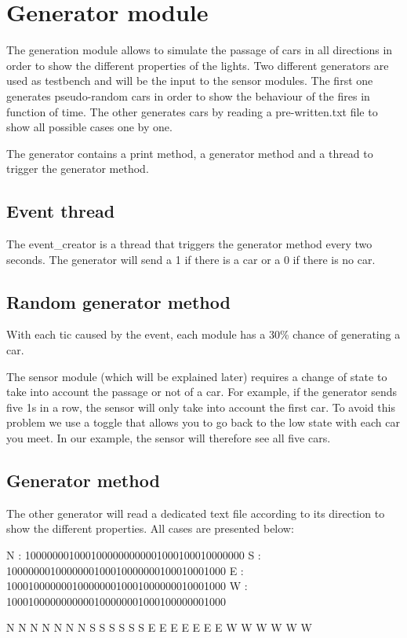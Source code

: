 \section{Generator module}

The generation module allows to simulate the passage of cars in all directions in order to show the different properties of the lights. Two different generators are used as testbench and will be the input to the sensor modules. 
The first one generates pseudo-random cars in order to show the behaviour of the fires in function of time.
The other generates cars by reading a pre-written.txt file to show all possible cases one by one. 

The generator contains a print method, a generator method and a thread to trigger the generator method.

\subsection{Event thread}

The event_creator is a thread that triggers the generator method every two seconds. The generator will send a 1 if there is a car or a 0 if there is no car.

\subsection{Random generator method}

With each tic caused by the event, each module has a 30\% chance of generating a car.

The sensor module (which will be explained later) requires a change of state to take into account the passage or not of a car. For example, if the generator sends five 1s in a row, the sensor will only take into account the first car. 
To avoid this problem we use a toggle that allows you to go back to the low state with each car you meet. In our example, the sensor will therefore see all five cars.

\subsection{Generator method}

The other generator will read a dedicated text file according to its direction to show the different properties. 
All cases are presented below: 

N : 1000000010001000000000001000100010000000
S : 1000000010000000100010000000100010001000
E : 1000100000001000000010001000000010001000
W : 1000100000000000100000001000100000001000

	N		N	N	N		N	N	N
	S		S			S		S	S	S
	E	E		E		E	E		E	E
	W	W			W		W	W		W